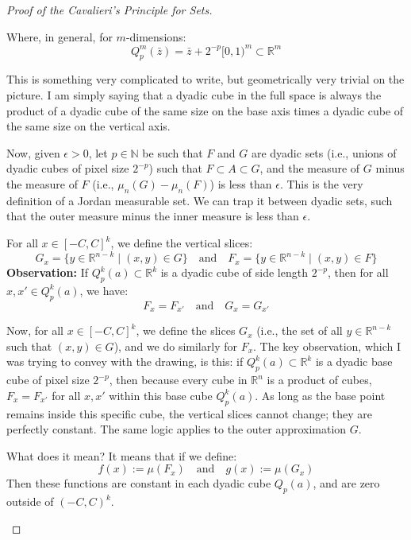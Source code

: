 \begin{proof}[Proof of the Cavalieri's Principle for Sets]
\begin{math-stroke}
Where, in general, for $m$-dimensions:
\[
Q_p^m(\bar{z}) = \bar{z} + 2^{-p} [0,1)^m \subset \mathbb{R}^m
\]
\end{math-stroke}

\begin{spoken-clean}[00:07:10 - 00:07:37]
This is something very complicated to write, but geometrically very trivial on the picture. I am simply saying that a dyadic cube in the full space is always the product of a dyadic cube of the same size on the base axis times a dyadic cube of the same size on the vertical axis.
\end{spoken-clean}

\begin{spoken-clean}[00:07:37 - 00:08:15]
Now, given $\epsilon > 0$, let $p \in \mathbb{N}$ be such that $F$ and $G$ are dyadic sets (i.e., unions of dyadic cubes of pixel size $2^{-p}$) such that $F \subset A \subset G$, and the measure of $G$ minus the measure of $F$ (i.e., $\mu_n(G) - \mu_n(F)$) is less than $\epsilon$. This is the very definition of a Jordan measurable set. We can trap it between dyadic sets, such that the outer measure minus the inner measure is less than $\epsilon$.
\end{spoken-clean}

\begin{math-stroke}
For all $x \in [-C,C]^k$, we define the vertical slices:
\[
G_x = \{ y \in \mathbb{R}^{n-k} \mid (x,y) \in G \} \quad \text{and} \quad F_x = \{ y \in \mathbb{R}^{n-k} \mid (x,y) \in F \}
\]
\textbf{Observation:} If $Q_p^k(a) \subset \mathbb{R}^k$ is a dyadic cube of side length $2^{-p}$, then for all $x, x' \in Q_p^k(a)$, we have:
\[
F_x = F_{x'} \quad \text{and} \quad G_x = G_{x'}
\]
\end{math-stroke}

\begin{spoken-clean}[00:08:15 - 00:09:47]
Now, for all $x \in [-C,C]^k$, we define the slices $G_x$ (i.e., the set of all $y \in \mathbb{R}^{n-k}$ such that $(x,y) \in G$), and we do similarly for $F_x$. The key observation, which I was trying to convey with the drawing, is this: if $Q_p^k(a) \subset \mathbb{R}^k$ is a dyadic base cube of pixel size $2^{-p}$, then because every cube in $\mathbb{R}^n$ is a product of cubes, $F_x = F_{x'}$ for all $x, x'$ within this base cube $Q_p^k(a)$. As long as the base point remains inside this specific cube, the vertical slices cannot change; they are perfectly constant. The same logic applies to the outer approximation $G$.
\end{spoken-clean}

\begin{math-stroke}
What does it mean? It means that if we define:
\[
f(x) := \mu(F_x) \quad \text{and} \quad g(x) := \mu(G_x)
\]
Then these functions are constant in each dyadic cube $Q_p(a)$, and are zero outside of $(-C,C)^k$.
\end{math-stroke}
\end{proof}
